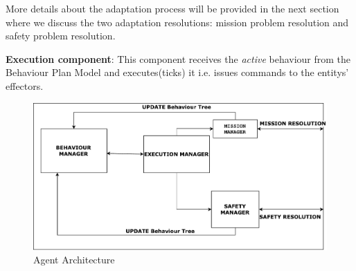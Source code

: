 \documentclass[journal]{IEEEtran}
\theoremstyle{definition}
\newcommand\darko[1]{\nb{Darko}{#1}}
\begin{document}

More details about the adaptation process will be provided in the next section where we discuss the two adaptation resolutions: mission problem resolution and safety problem resolution. 

\textbf{Execution component}: This component receives   the \textit{active} behaviour from the Behaviour Plan Model and executes(ticks) it i.e. issues commands to the entitys' effectors.




\darko{end}




\begin{figure}[h]
\includegraphics[width=.5\textwidth]{Figures/AgentArchitecture1.pdf}
\caption{Agent Architecture}\label{fig:agentsArchitecture}
\end{figure}
\end{document}
